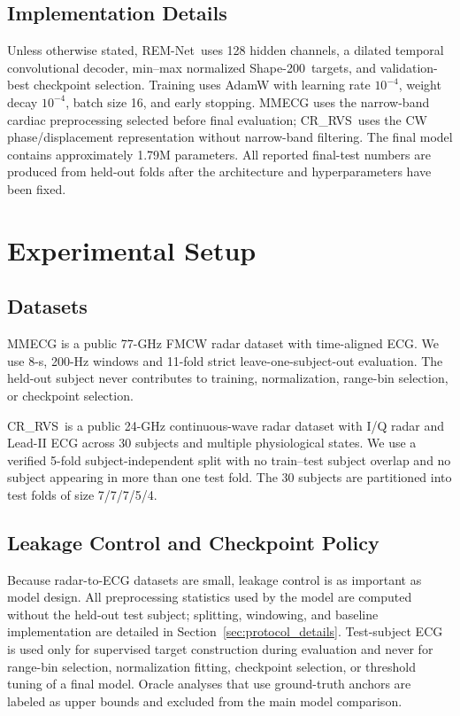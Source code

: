 \documentclass[lettersize,journal]{IEEEtran}
\newcommand{\remnet}{REM-Net\xspace}
\newcommand{\shape}{Shape-200\xspace}
\newcommand{\crrvs}{CR\_RVS\xspace}
\begin{document}
\subsection{Implementation Details}
Unless otherwise stated, \remnet\ uses 128 hidden channels, a dilated temporal convolutional decoder, min--max normalized \shape\ targets, and validation-best checkpoint selection. Training uses AdamW with learning rate $10^{-4}$, weight decay $10^{-4}$, batch size 16, and early stopping. MMECG uses the narrow-band cardiac preprocessing selected before final evaluation; \crrvs\ uses the CW phase/displacement representation without narrow-band filtering. The final model contains approximately 1.79M parameters. All reported final-test numbers are produced from held-out folds after the architecture and hyperparameters have been fixed.

\section{Experimental Setup}

\subsection{Datasets}
MMECG is a public 77-GHz FMCW radar dataset with time-aligned ECG. We use 8-s, 200-Hz windows and 11-fold strict leave-one-subject-out evaluation. The held-out subject never contributes to training, normalization, range-bin selection, or checkpoint selection.

\crrvs\ is a public 24-GHz continuous-wave radar dataset with I/Q radar and Lead-II ECG across 30 subjects and multiple physiological states. We use a verified 5-fold subject-independent split with no train--test subject overlap and no subject appearing in more than one test fold. The 30 subjects are partitioned into test folds of size 7/7/7/5/4.

\subsection{Leakage Control and Checkpoint Policy}
Because radar-to-ECG datasets are small, leakage control is as important as model design. All preprocessing statistics used by the model are computed without the held-out test subject; splitting, windowing, and baseline implementation are detailed in Section~\ref{sec:protocol_details}. Test-subject ECG is used only for supervised target construction during evaluation and never for range-bin selection, normalization fitting, checkpoint selection, or threshold tuning of a final model. Oracle analyses that use ground-truth anchors are labeled as upper bounds and excluded from the main model comparison.
\end{document}
